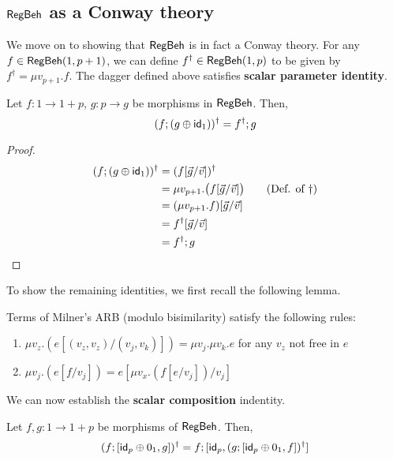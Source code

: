 \subsection{$\mathsf{RegBeh}$ as a Conway theory}
We move on to showing that $\mathsf{RegBeh}$ is in fact a Conway theory. For any $f \in \mathsf{RegBeh}(1, p + 1)$, we can define $f^\dagger \in \mathsf{RegBeh}(1,p)$ to be given by $f^\dagger = \mu v_{p+1}.f$.
The dagger defined above satisfies \textbf{scalar parameter identity}.
\begin{lemma}\label{conway1}
	Let $f \colon 1 \to 1 + p$, $g \colon p \to g$ be morphisms in $\mathsf{RegBeh}$. Then,
	$$
	(f ; (g\oplus \mathsf{id}_1))^\dagger = f^\dagger ; g
	$$
\end{lemma}
\begin{proof}
\begin{align*}
(f ; (g \oplus \mathsf{id}_1))^\dagger & = (f[\vec{g}/\vec{v}])^\dagger
\\
& = \mu v_{p+1}.\big(f[\vec{g}/\vec{v}]\big) \tag{Def. of $\dagger$}
\\
& = (\mu v_{p+1}.f)[\vec{g}/\vec{v}] 
\\
& = f^\dagger[\vec{g}/\vec{v}] 
\\
& = f^\dagger ; g \qedhere
\end{align*}
\end{proof}
To show the remaining identities, we first recall the following lemma.
 \begin{lemma}
\label{lem:recursion-substitution}
Terms of Milner's ARB (modulo bisimilarity) satisfy the following rules:
	\begin{enumerate}
		\item $\mu v_z. \left(e [(v_z, v_z) / (v_j, v_k)]\right) = \mu v_j. \mu v_k. e$ for any $v_z$ not free in $e$
		\item $ \mu v_j.\left(e[f/v_j]\right) = e[\mu v_x. \left(f[e/v_j]\right)/v_j]$
	\end{enumerate}
\end{lemma}
We can now establish the \textbf{scalar composition} indentity.
\begin{lemma}\label{conway2}
Let $f,g \colon 1 \to 1 + p$ be morphisms of $\mathsf{RegBeh}$. Then,
		$$
		(f ; [  \mathsf{id}_p \oplus 0_1 , g ])^\dagger = f ; [ \mathsf{id}_p, (g ;  [  \mathsf{id}_p \oplus 0_1 , f])^\dagger]
		$$ 
\end{lemma}

